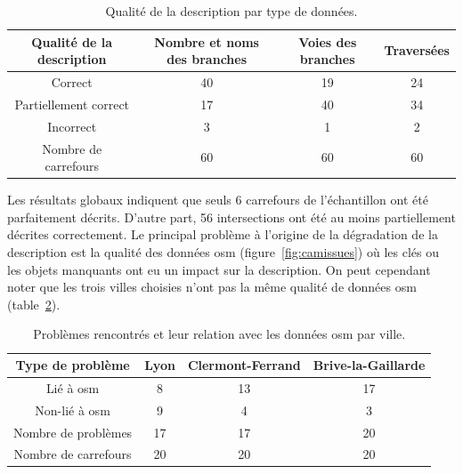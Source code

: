 \begin{table}[ht]
    \begin{center}
        \footnotesize
        \begin{tabular}{ c | c | c | c }
            Qualité de la description & Nombre et noms des branches & Voies des branches & Traversées\\
            \hline
            Correct & 40  & 19 & 24 \\
            Partiellement correct & 17 & 40 & 34 \\
            Incorrect & 3 & 1 & 2 \\
            \hline
            Nombre de carrefours & 60 & 60 & 60
        \end{tabular}
        \caption[Qualité de la description par type de données]{Qualité de la description par type de données.}
        \label{tab:descqualitybydesctype}
    \end{center}
\end{table}

\newpar{}

Les résultats globaux indiquent que seuls 6 carrefours de l'échantillon ont été parfaitement décrits. D'autre part, 56 intersections ont été au moins partiellement décrites correctement. Le principal problème à l'origine de la dégradation de la description est la qualité des données \gls{osm} (figure~\ref{fig:camissues}) où les clés ou les objets manquants ont eu un impact sur la description. On peut cependant noter que les trois villes choisies n'ont pas la même qualité de données \gls{osm} (table~\ref{tab:osmqualityissues}).

\begin{table}[ht]
    \begin{center}
        \footnotesize
        \begin{tabular}{c | c | c | c }
            Type de problème & Lyon & Clermont-Ferrand & Brive-la-Gaillarde\\
            \hline
            Lié à \gls{osm} & 8  & 13 & 17 \\
            Non-lié à \gls{osm} & 9 & 4 & 3 \\
            \hline
            Nombre de problèmes & 17 & 17 & 20 \\
            Nombre de carrefours & 20 & 20 & 20
        \end{tabular}
        \caption[Relation entre les problèmes rencontrés et les données OpenStreetMap]{Problèmes rencontrés et leur relation avec les données \gls{osm} par ville.}
        \label{tab:osmqualityissues}
    \end{center}
\end{table}

